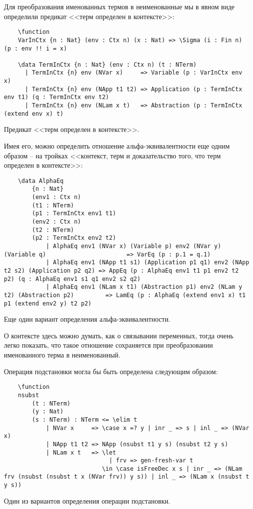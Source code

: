 Для преобразования именованных термов в неименованные мы в явном виде определили предикат <<терм определен в контексте>>:

\begin{listing}[H]
  \begin{verbatim}
    \function
    VarInCtx {n : Nat} (env : Ctx n) (x : Nat) => \Sigma (i : Fin n) (p : env !! i = x)

    \data TermInCtx {n : Nat} (env : Ctx n) (t : NTerm)
      | TermInCtx {n} env (NVar x)     => Variable (p : VarInCtx env x)
      | TermInCtx {n} env (NApp t1 t2) => Application (p : TermInCtx env t1) (q : TermInCtx env t2)
      | TermInCtx {n} env (NLam x t)   => Abstraction (p : TermInCtx (extend env x) t)
  \end{verbatim}
  \caption{Предикат <<терм определен в контексте>>.}
\end{listing}

Имея его, можно определить отношение альфа-эквивалентности еще одним образом -- на тройках <<контекст, терм и доказательство того, что терм определен в контексте>>:

\begin{listing}[H]
  \begin{verbatim}
    \data AlphaEq
        {n : Nat}
        (env1 : Ctx n)
        (t1 : NTerm)
        (p1 : TermInCtx env1 t1)
        (env2 : Ctx n)
        (t2 : NTerm)
        (p2 : TermInCtx env2 t2)
            | AlphaEq env1 (NVar x) (Variable p) env2 (NVar y) (Variable q)                       => VarEq (p : p.1 = q.1)
            | AlphaEq env1 (NApp t1 s1) (Application p1 q1) env2 (NApp t2 s2) (Application p2 q2) => AppEq (p : AlphaEq env1 t1 p1 env2 t2 p2) (q : AlphaEq env1 s1 q1 env2 s2 q2)
            | AlphaEq env1 (NLam x t1) (Abstraction p1) env2 (NLam y t2) (Abstraction p2)         => LamEq (p : AlphaEq (extend env1 x) t1 p1 (extend env2 y) t2 p2)
  \end{verbatim}
  \caption{Еще один вариант определения альфа-эквивалентности.}
\end{listing}

О контексте здесь можно думать, как о связывании переменных, тогда очень легко показать, что такое отношение сохраняется при преобразовании именованного терма в неименованный.

Операция подстановки могла бы быть определена следующим образом:
\begin{listing}[H]
  \begin{verbatim}
    \function
    nsubst
        (t : NTerm)
        (y : Nat)
        (s : NTerm) : NTerm <= \elim t
            | NVar x     => \case x =? y | inr _ => s | inl _ => (NVar x)
            | NApp t1 t2 => NApp (nsubst t1 y s) (nsubst t2 y s)
            | NLam x t   => \let
                              | frv => gen-fresh-var t
                            \in \case isFreeDec x s | inr _ => (NLam frv (nsubst (nsubst t x (NVar frv)) y s)) | inl _ => (NLam x (nsubst t y s))
  \end{verbatim}
  \caption{Один из вариантов определения операции подстановки.}
\end{listing}

